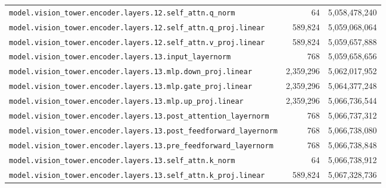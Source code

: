\documentclass[10pt,a4paper]{article}
\theoremstyle{definition}
\begin{document}
\begin{appendices}
\begin{longtable}{p{9.5cm}rr}
\texttt{model.\allowbreak{}vision\_tower.\allowbreak{}encoder.\allowbreak{}layers.\allowbreak{}12.\allowbreak{}self\_attn.\allowbreak{}q\_norm} & 64 & 5,058,478,240 \\
\texttt{model.\allowbreak{}vision\_tower.\allowbreak{}encoder.\allowbreak{}layers.\allowbreak{}12.\allowbreak{}self\_attn.\allowbreak{}q\_proj.\allowbreak{}linear} & 589,824 & 5,059,068,064 \\
\texttt{model.\allowbreak{}vision\_tower.\allowbreak{}encoder.\allowbreak{}layers.\allowbreak{}12.\allowbreak{}self\_attn.\allowbreak{}v\_proj.\allowbreak{}linear} & 589,824 & 5,059,657,888 \\
\texttt{model.\allowbreak{}vision\_tower.\allowbreak{}encoder.\allowbreak{}layers.\allowbreak{}13.\allowbreak{}input\_layernorm} & 768 & 5,059,658,656 \\
\texttt{model.\allowbreak{}vision\_tower.\allowbreak{}encoder.\allowbreak{}layers.\allowbreak{}13.\allowbreak{}mlp.\allowbreak{}down\_proj.\allowbreak{}linear} & 2,359,296 & 5,062,017,952 \\
\texttt{model.\allowbreak{}vision\_tower.\allowbreak{}encoder.\allowbreak{}layers.\allowbreak{}13.\allowbreak{}mlp.\allowbreak{}gate\_proj.\allowbreak{}linear} & 2,359,296 & 5,064,377,248 \\
\texttt{model.\allowbreak{}vision\_tower.\allowbreak{}encoder.\allowbreak{}layers.\allowbreak{}13.\allowbreak{}mlp.\allowbreak{}up\_proj.\allowbreak{}linear} & 2,359,296 & 5,066,736,544 \\
\texttt{model.\allowbreak{}vision\_tower.\allowbreak{}encoder.\allowbreak{}layers.\allowbreak{}13.\allowbreak{}post\_attention\_layernorm} & 768 & 5,066,737,312 \\
\texttt{model.\allowbreak{}vision\_tower.\allowbreak{}encoder.\allowbreak{}layers.\allowbreak{}13.\allowbreak{}post\_feedforward\_layernorm} & 768 & 5,066,738,080 \\
\texttt{model.\allowbreak{}vision\_tower.\allowbreak{}encoder.\allowbreak{}layers.\allowbreak{}13.\allowbreak{}pre\_feedforward\_layernorm} & 768 & 5,066,738,848 \\
\texttt{model.\allowbreak{}vision\_tower.\allowbreak{}encoder.\allowbreak{}layers.\allowbreak{}13.\allowbreak{}self\_attn.\allowbreak{}k\_norm} & 64 & 5,066,738,912 \\
\texttt{model.\allowbreak{}vision\_tower.\allowbreak{}encoder.\allowbreak{}layers.\allowbreak{}13.\allowbreak{}self\_attn.\allowbreak{}k\_proj.\allowbreak{}linear} & 589,824 & 5,067,328,736 \\

\end{longtable}
\end{appendices}
\end{document}
